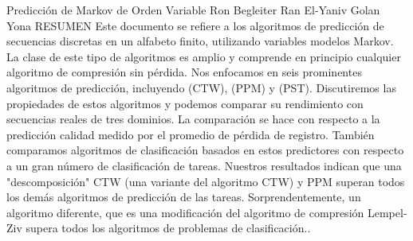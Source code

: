 Predicción de Markov de Orden Variable
Ron Begleiter
Ran El-Yaniv
Golan Yona
RESUMEN
Este documento se refiere a los algoritmos de predicción de secuencias discretas en un alfabeto finito, utilizando variables modelos Markov. La clase de este tipo de algoritmos es amplio y comprende en principio cualquier algoritmo de compresión sin pérdida. Nos enfocamos en seis prominentes algoritmos de predicción, incluyendo  (CTW), (PPM) y (PST).  Discutiremos las propiedades de estos algoritmos y podemos comparar su rendimiento con secuencias reales de tres dominios.
La comparación se hace con respecto a la predicción calidad medido por el promedio de pérdida de registro. También comparamos algoritmos de clasificación basados en estos predictores con respecto a un gran número de clasificación de  tareas. Nuestros resultados indican que una "descomposición" CTW (una variante del algoritmo CTW) y PPM superan todos los demás algoritmos de predicción de las tareas. Sorprendentemente, un algoritmo diferente, que es una modificación del algoritmo de compresión Lempel-Ziv supera todos los algoritmos de  problemas de clasificación..

